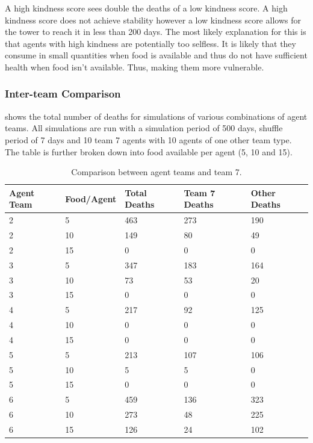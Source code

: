 A high kindness score sees double the deaths of a low kindness score. A high kindness score does not achieve stability however a low kindness score allows for the tower to reach it in less than 200 days. The most likely explanation for this is that agents with high kindness are potentially too selfless. It is likely that they consume in small quantities when food is available and thus do not have sufficient health when food isn't available. Thus, making them more vulnerable.

\subsubsection{Inter-team Comparison}
 shows the total number of deaths for simulations of various combinations of agent teams. All simulations are run with a simulation period of 500 days, shuffle period of 7 days and 10 team 7 agents with 10 agents of one other team type. The table is further broken down into food available per agent (5, 10 and 15).

\begin{table}
    \begin{center}
    \begin{tabular} { | m{4em} | m{6em} | m{4em} | m{4em} | m{4em} | }
        \hline
        \textbf{Agent Team} & \textbf{Food/Agent} & \textbf{Total Deaths} & \textbf{Team 7 Deaths} & \textbf{Other Deaths} \\
        \hline
        2 & 5 & 463 & 273 & 190 \\
        \hline
        2 & 10 & 149 & 80 & 49 \\
        \hline
        2 & 15 & 0 & 0 & 0 \\
        \hline
        3 & 5 & 347 & 183 & 164\\
        \hline
        3 & 10 & 73 & 53 & 20\\
        \hline
        3 & 15 & 0 & 0 & 0 \\
        \hline
        4 & 5 & 217 & 92 & 125\\
        \hline
        4 & 10 & 0 & 0 & 0 \\
        \hline
        4 & 15 & 0 & 0 & 0 \\
        \hline
        5 & 5 & 213 & 107 & 106 \\
        \hline
        5 & 10 & 5 & 5 & 0 \\
        \hline
        5 & 15 &  0 & 0 & 0 \\ 
        \hline
        6 & 5 & 459 & 136 & 323 \\
        \hline
        6 & 10 & 273 & 48 & 225 \\
        \hline
        6 & 15 & 126 & 24 & 102 \\
        \hline
    \end{tabular}
    \end{center}
    \caption{Comparison between agent teams and team 7.}
    \label{tab: Inter-team data}
\end{table}


